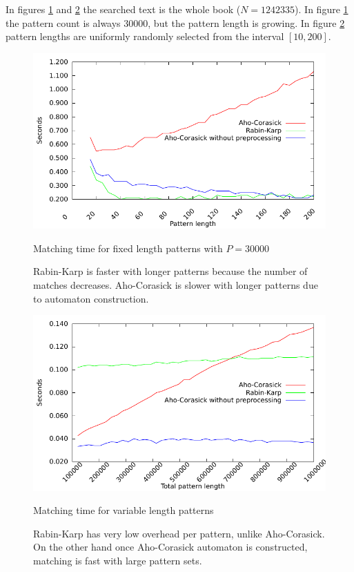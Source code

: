 \documentclass[final]{beamer}
\begin{document}
\begin{poster}
In figures \ref{fig:fixed_len} and \ref{fig:var_len} the searched text is the whole book ($N=1242335$).
In figure \ref{fig:fixed_len} the pattern count is always 30000, but the pattern length is
growing.
In figure \ref{fig:var_len} pattern lengths are uniformly randomly selected from the interval $[10,200]$.

\newcolumn
\begin{figure}
\label{fig:fixed_len}
\centering
 \includegraphics[width=23cm]{fixed_len.pdf}
\caption{Matching time for fixed length patterns with $P=30000$}
\caption*{
Rabin-Karp is faster with longer patterns because the number of matches decreases.
Aho-Corasick is slower with longer patterns due to automaton construction.
}
\end{figure}
\begin{figure}
\label{fig:var_len}
\centering
 \includegraphics[width=23cm]{var_len.pdf}
\caption{Matching time for variable length patterns}
\caption*{
Rabin-Karp has very low overhead per pattern, unlike Aho-Corasick.
On the other hand once Aho-Corasick automaton is constructed,
matching is fast with large pattern sets.
}
\end{figure}


\end{poster}
\end{document}
